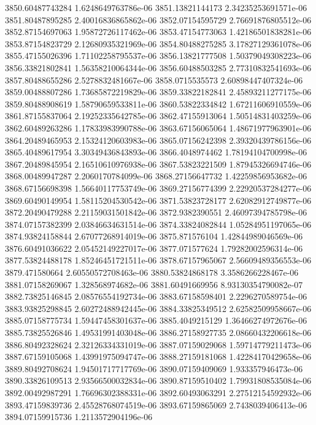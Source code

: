 {3850.60487743284 1.6248649763786e-06
3851.13821144173 2.34235253691571e-06
3851.80487895285 2.40016836865862e-06
3852.07154595729 2.76691876805512e-06
3852.87154697063 1.95872726117462e-06
3853.47154773063 1.42186501838281e-06
3853.87154823729 2.12680935321969e-06
3854.80488275285 3.17827129361078e-06
3855.47155026396 1.71102258795537e-06
3856.13821777508 1.50379049308223e-06
3856.33821802841 1.56358210064344e-06
3856.60488503285 2.77310832541693e-06
3857.80488655286 2.5278832481667e-06
3858.0715535573 2.60898447407324e-06
3859.00488807286 1.73685872219829e-06
3859.33822182841 2.45893211277175e-06
3859.80488908619 1.58790659533811e-06
3860.53822334842 1.67211606910559e-06
3861.87155837064 2.19252335642785e-06
3862.47155913064 1.50514831403259e-06
3862.60489263286 1.17833983990788e-06
3863.67156065064 1.48671977963901e-06
3864.20489465953 2.15324120603983e-06
3865.07156242398 2.39320439786156e-06
3865.40489617954 3.30349436843893e-06
3866.4048974462 1.78194104700998e-06
3867.20489845954 2.16510610976938e-06
3867.53823221509 1.87945326694746e-06
3868.00489947287 2.2060170784099e-06
3868.27156647732 1.42259856953682e-06
3868.67156698398 1.56640117753749e-06
3869.27156774399 2.22920537284277e-06
3869.60490149954 1.58115204530542e-06
3871.53823728177 2.62082912749877e-06
3872.20490479288 2.21159031501842e-06
3872.9382390551 2.46097394785798e-06
3874.07157382399 2.03846634631514e-06
3874.33824082844 1.05284951197065e-06
3874.93824158844 2.67077268914019e-06
3875.871576104 1.42844989046569e-06
3876.60491036622 2.05452149227017e-06
3877.071577624 1.79282002596314e-06
3877.53824488178 1.85246451721511e-06
3878.67157965067 2.56609489356553e-06
3879.471580664 2.60550572708463e-06
3880.53824868178 3.3586266228467e-06
3881.07158269067 1.328568974682e-06
3881.60491669956 8.93130354790082e-07
3882.73825146845 2.08576554192734e-06
3883.67158598401 2.2296270589754e-06
3883.93825298845 2.60272488942445e-06
3884.33825349512 2.62582509958667e-06
3885.07158775734 1.59447458301637e-06
3885.4049215129 1.36466274972676e-06
3885.73825526846 1.49531991403048e-06
3886.27158927735 2.08660432206618e-06
3886.80492328624 2.32126334331019e-06
3887.07159029068 1.59714779211473e-06
3887.67159105068 1.43991975094747e-06
3888.27159181068 1.42284170429658e-06
3889.80492708624 1.94501717717769e-06
3890.07159409069 1.933357946473e-06
3890.33826109513 2.93566500032834e-06
3890.87159510402 1.79931808535084e-06
3892.00492987291 1.76696302388331e-06
3892.60493063291 2.27512154592932e-06
3893.47159839736 2.45528768074519e-06
3893.67159865069 2.7438039406413e-06
3894.07159915736 1.2113572904196e-06
}
